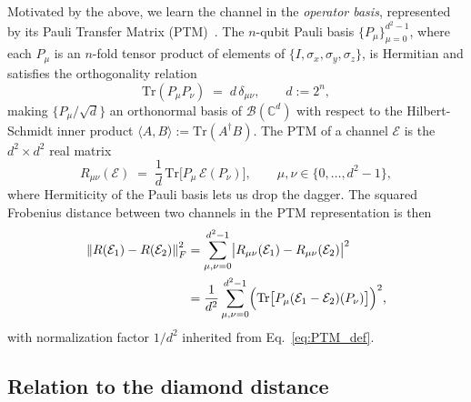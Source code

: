 \documentclass[%
 reprint,
superscriptaddress,
 amsmath,amssymb,
 aps,
]{revtex4-2}
\newcommand{\E}{\mathcal{E}}
\newcommand{\norm}[1]{\left\lVert#1\right\rVert}
\begin{document}
Motivated by the above, we learn the channel in the \emph{operator basis}, represented by its Pauli Transfer Matrix (PTM)~\cite{greenbaum2015gst,chow2009randomized}. The $n$-qubit Pauli basis $\{P_\mu\}_{\mu=0}^{d^2-1}$, where each $P_\mu$ is an $n$-fold tensor product of elements of $\{I,\sigma_x,\sigma_y,\sigma_z\}$, is Hermitian and satisfies the orthogonality relation
\begin{equation}
    \mathrm{Tr}(P_\mu P_\nu) \;=\; d\,\delta_{\mu\nu},\qquad d:=2^n,
    \label{eq:pauli_orthogonality}
\end{equation}
making $\{P_\mu/\sqrt{d}\}$ an orthonormal basis of $\mathcal{B}(\mathbb{C}^d)$ with respect to the Hilbert-Schmidt inner product $\langle A,B\rangle:=\mathrm{Tr}(A^\dagger B)$. The PTM of a channel $\E$ is the $d^2\times d^2$ real matrix~\cite{greenbaum2015gst}
\begin{equation}
    R_{\mu\nu}(\E) \;=\; \frac{1}{d}\,\mathrm{Tr}\bigl[P_\mu\,\E(P_\nu)\bigr],\qquad \mu,\nu\in\{0,\ldots,d^2-1\},
    \label{eq:PTM_def}
\end{equation}
where Hermiticity of the Pauli basis lets us drop the dagger. The squared Frobenius distance between two channels in the PTM representation is then
\begin{equation}
\begin{split}
    \norm{R(\E_1)-R(\E_2)}_F^2 &= \sum_{\mu,\nu=0}^{d^2-1}\bigl|R_{\mu\nu}(\E_1)-R_{\mu\nu}(\E_2)\bigr|^2\\
    &= \frac{1}{d^2}\sum_{\mu,\nu=0}^{d^2-1}\Bigl(\mathrm{Tr}\bigl[P_\mu(\E_1-\E_2)(P_\nu)\bigr]\Bigr)^2,
\end{split}
    \label{eq:FrobeniusR_definition}
\end{equation}
with normalization factor $1/d^2$ inherited from Eq.~\eqref{eq:PTM_def}.

\subsection{Relation to the diamond distance}
\end{document}
